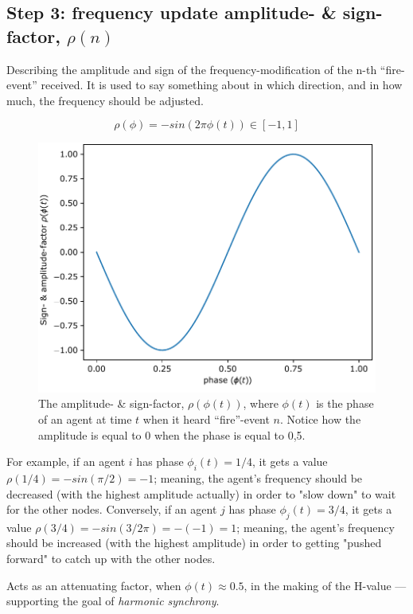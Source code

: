 \subsection{Step 3: frequency update amplitude- \& sign-factor, $\rho(n)$}

Describing the amplitude and sign of the frequency-modification of the n-th ``fire-event'' received. It is used to say something about in which direction, and in how much, the frequency should be adjusted.

\begin{equation}
\label{amp_sign_freq_adj}
	\rho(\phi) = - sin(2\pi\phi(t)) \in [-1, 1]
\end{equation}

\begin{figure}[ht!]
	\centering
	\includegraphics[width=0.65\linewidth]{Assets/Figures/Functions/rho_n.pdf}
	\caption[Plot of amplitude- \& sign-factor for K. Nymoen's frequency-adjustment]{The amplitude- \& sign-factor, $\rho(\phi(t))$, where $\phi(t)$ is the phase of an agent at time $t$ when it heard ``fire''-event $n$. Notice how the amplitude is equal to 0 when the phase is equal to 0,5.}
	\label{fig:rho_n}
\end{figure}

For example, if an agent $i$ has phase $\phi_i(t)=1/4$, it gets a value $\rho(1/4) = - sin(\pi/2) = -1$; meaning, the agent's frequency should be decreased (with the highest amplitude actually) in order to "slow down" to wait for the other nodes. Conversely, if an agent $j$ has phase $\phi_j(t)=3/4$, it gets a value $\rho(3/4) = - sin(3/2 \pi) = -(-1) = 1$; meaning, the agent's frequency should be increased (with the highest amplitude) in order to getting "pushed forward" to catch up with the other nodes.

Acts as an attenuating factor, when $\phi(t)\approx0.5$, in the making of the H-value — supporting the goal of \textit{harmonic synchrony}.

